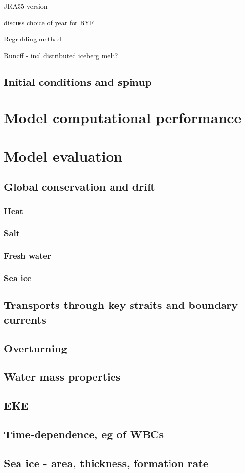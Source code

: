 \documentclass[11pt]{report}
\begin{document}
JRA55 version

discuss choice of year for RYF

Regridding method

Runoff - incl distributed iceberg melt?

\subsection{Initial conditions and spinup}

\section{Model computational performance}

\section{Model evaluation}

\subsection{Global conservation and drift}

\subsubsection{Heat}

\subsubsection{Salt}

\subsubsection{Fresh water}

\subsubsection{Sea ice}


\subsection{Transports through key straits and boundary currents}

\subsection{Overturning}

\subsection{Water mass properties}

\subsection{EKE}

\subsection{Time-dependence, eg of WBCs}

\subsection{Sea ice - area, thickness, formation rate}



\end{document}
